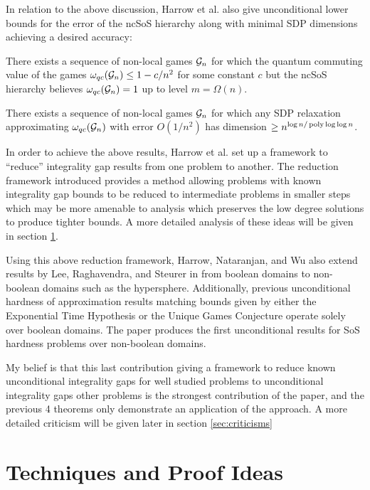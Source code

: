 \documentclass[runningheads,a4paper,english]{llncs}[2022/01/12]
\begin{document}
In relation to the above discussion, Harrow et al. also give unconditional lower bounds for the error of the ncSoS hierarchy along with minimal SDP dimensions achieving a desired accuracy:

\begin{theorem}
  There exists a sequence of non-local games $\mathcal{G}_n$ for which the quantum commuting value of the games $\omega_{qc}(\mathcal{G}_n) \le 1 - c/n^2$ for some constant $c$ but the ncSoS hierarchy believes $\omega_{qc}(\mathcal{G}_n) = 1$ up to level $m = \Omega(n)$.
\end{theorem}

\begin{theorem}
  There exists a sequence of non-local games $\mathcal{G}_n$ for which any SDP relaxation approximating $\omega_{qc}(\mathcal{G}_n)$ with error $O(1/n^2)$ has dimension $\ge n^{\log n/\operatorname{poly} \log \log n}$.
\end{theorem}

In order to achieve the above results, Harrow et al. set up a framework to ``reduce'' integrality gap results from one problem to another.
The reduction framework introduced provides a method allowing problems with known integrality gap bounds to be reduced to intermediate problems in smaller steps which may be more amenable to analysis which preserves the low degree solutions to produce tighter bounds.
A more detailed analysis of these ideas will be given in section \ref{sec:techniques}.

Using this above reduction framework, Harrow, Nataranjan, and Wu also extend results by Lee, Raghavendra, and Steurer in \cite{lee2014lowerboundssizesemidefinite} from boolean domains to non-boolean domains such as the hypersphere.
Additionally, previous unconditional hardness of approximation results \cite{tulsiani2009csp,odonnell2014hardnessrobustgraphisomorphism} matching bounds given by either the Exponential Time Hypothesis or the Unique Games Conjecture operate solely over boolean domains.
The paper produces the first unconditional results for SoS hardness problems over non-boolean domains.

My belief is that this last contribution giving a framework to reduce known unconditional integrality gaps for well studied problems to unconditional integrality gaps other problems is the strongest contribution of the paper, and the previous 4 theorems only demonstrate an application of the approach.
A more detailed criticism will be given later in section \ref{sec:criticisms}

\section{Techniques and Proof Ideas}
\label{sec:techniques}
\end{document}
